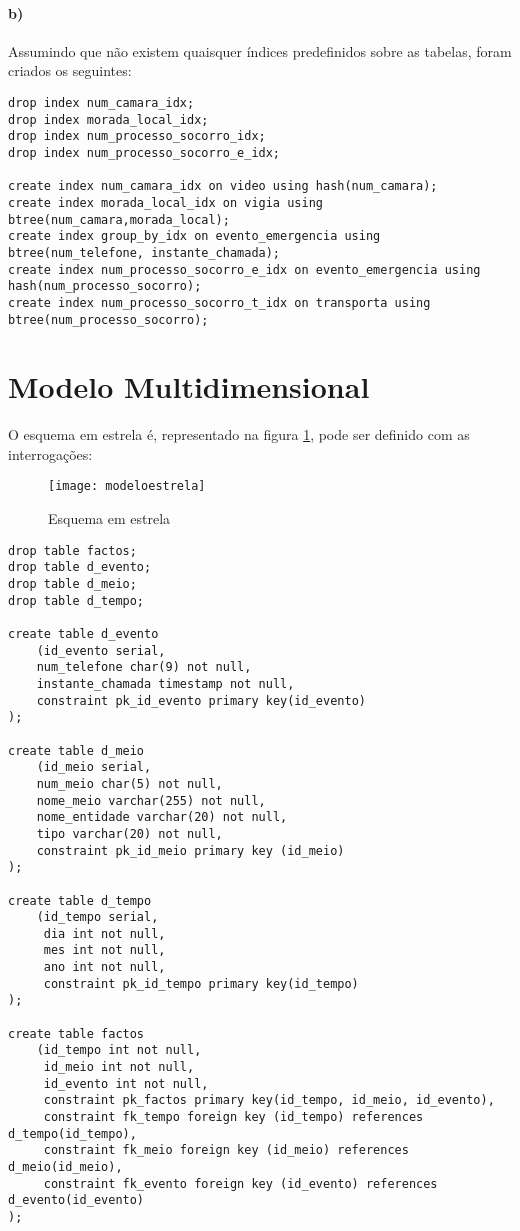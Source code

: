\documentclass[10pt,a4paper]{article}
\begin{document}
\paragraph{b)}
Assumindo que não existem quaisquer índices predefinidos sobre as tabelas, foram criados os seguintes:

\begin{verbatim}
drop index num_camara_idx;
drop index morada_local_idx;
drop index num_processo_socorro_idx;
drop index num_processo_socorro_e_idx;

create index num_camara_idx on video using hash(num_camara);
create index morada_local_idx on vigia using btree(num_camara,morada_local);
create index group_by_idx on evento_emergencia using btree(num_telefone, instante_chamada);
create index num_processo_socorro_e_idx on evento_emergencia using hash(num_processo_socorro);
create index num_processo_socorro_t_idx on transporta using btree(num_processo_socorro);
\end{verbatim}

\section{Modelo Multidimensional}

O esquema em estrela é, representado na figura \ref{f1}, pode ser definido com as interrogações:

\begin{figure}[h]
	\centering
	\texttt{[image: modeloestrela]}
	\caption{Esquema em estrela}
	\label{f1}
\end{figure}

\begin{verbatim}
drop table factos;
drop table d_evento;
drop table d_meio;
drop table d_tempo;

create table d_evento
    (id_evento serial,
    num_telefone char(9) not null,
    instante_chamada timestamp not null,
    constraint pk_id_evento primary key(id_evento)
);

create table d_meio
    (id_meio serial,
    num_meio char(5) not null,
    nome_meio varchar(255) not null,
    nome_entidade varchar(20) not null,
    tipo varchar(20) not null,
    constraint pk_id_meio primary key (id_meio)
);

create table d_tempo
    (id_tempo serial,
     dia int not null,
     mes int not null,
     ano int not null,
     constraint pk_id_tempo primary key(id_tempo)
);

create table factos
    (id_tempo int not null,
     id_meio int not null,
     id_evento int not null,
     constraint pk_factos primary key(id_tempo, id_meio, id_evento),
     constraint fk_tempo foreign key (id_tempo) references d_tempo(id_tempo),
     constraint fk_meio foreign key (id_meio) references d_meio(id_meio),
     constraint fk_evento foreign key (id_evento) references d_evento(id_evento)
);
\end{verbatim}
\end{document}
